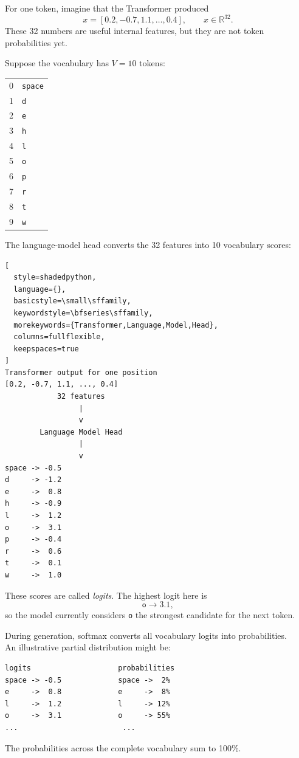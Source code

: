 For one token, imagine that the Transformer produced
\[
  x=[0.2,-0.7,1.1,\ldots,0.4],
  \qquad x\in\mathbb{R}^{32}.
\]
These 32 numbers are useful internal features, but they are not token
probabilities yet.

Suppose the vocabulary has \(V=10\) tokens:
\begin{center}
\begin{tabular}{@{}cl@{}}
  0 & \texttt{space} \\
  1 & \texttt{d} \\
  2 & \texttt{e} \\
  3 & \texttt{h} \\
  4 & \texttt{l} \\
  5 & \texttt{o} \\
  6 & \texttt{p} \\
  7 & \texttt{r} \\
  8 & \texttt{t} \\
  9 & \texttt{w}
\end{tabular}
\end{center}
The language-model head converts the 32 features into 10 vocabulary scores:
\begin{lstlisting}[
  style=shadedpython,
  language={},
  basicstyle=\small\sffamily,
  keywordstyle=\bfseries\sffamily,
  morekeywords={Transformer,Language,Model,Head},
  columns=fullflexible,
  keepspaces=true
]
Transformer output for one position
[0.2, -0.7, 1.1, ..., 0.4]
            32 features
                 |
                 v
        Language Model Head
                 |
                 v
space -> -0.5
d     -> -1.2
e     ->  0.8
h     -> -0.9
l     ->  1.2
o     ->  3.1
p     -> -0.4
r     ->  0.6
t     ->  0.1
w     ->  1.0
\end{lstlisting}

These scores are called \emph{logits}. The highest logit here is
\[
  \texttt{o}\longrightarrow3.1,
\]
so the model currently considers \texttt{o} the strongest candidate for the
next token.

During generation, softmax converts all vocabulary logits into
probabilities. \\

An illustrative partial distribution might be:

\begin{lstlisting}[style=shadedpython,language={}]
logits                    probabilities
space -> -0.5             space ->  2%
e     ->  0.8             e     ->  8%
l     ->  1.2             l     -> 12%
o     ->  3.1             o     -> 55%
...                        ...
\end{lstlisting}
The probabilities across the complete vocabulary sum to 100\%. \\


